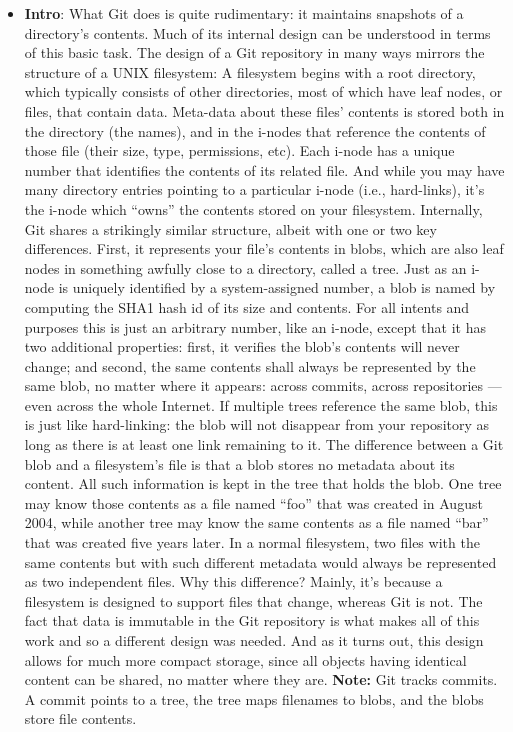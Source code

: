 \documentclass{report}
\begin{document}
\begin{itemize}
        \item \textbf{Intro}: What Git does is quite rudimentary: it maintains snapshots of a directory’s contents. Much of its internal design can be understood in terms of this basic task.
            \bigbreak \noindent 
            The design of a Git repository in many ways mirrors the structure of a UNIX filesystem: A filesystem begins with a root directory, which typically consists of other directories, most of which have leaf nodes, or files, that contain data. Meta-data about these files’ contents is stored both in the directory (the names), and in the i-nodes that reference the contents of those file (their size, type, permissions, etc). Each i-node has a unique number that identifies the contents of its related file. And while you may have many directory entries pointing to a particular i-node (i.e., hard-links), it’s the i-node which “owns” the contents stored on your filesystem.
            \bigbreak \noindent 
            Internally, Git shares a strikingly similar structure, albeit with one or two key differences. First, it represents your file’s contents in blobs, which are also leaf nodes in something awfully close to a directory, called a tree. Just as an i-node is uniquely identified by a system-assigned number, a blob is named by computing the SHA1 hash id of its size and contents. For all intents and purposes this is just an arbitrary number, like an i-node, except that it has two additional properties: first, it verifies the blob’s contents will never change; and second, the same contents shall always be represented by the same blob, no matter where it appears: across commits, across repositories — even across the whole Internet. If multiple trees reference the same blob, this is just like hard-linking: the blob will not disappear from your repository as long as there is at least one link remaining to it.
            \bigbreak \noindent 
            The difference between a Git blob and a filesystem’s file is that a blob stores no metadata about its content. All such information is kept in the tree that holds the blob. One tree may know those contents as a file named “foo” that was created in August 2004, while another tree may know the same contents as a file named “bar” that was created five years later. In a normal filesystem, two files with the same contents but with such different metadata would always be represented as two independent files. Why this difference? Mainly, it’s because a filesystem is designed to support files that change, whereas Git is not. The fact that data is immutable in the Git repository is what makes all of this work and so a different design was needed. And as it turns out, this design allows for much more compact storage, since all objects having identical content can be shared, no matter where they are.
            \bigbreak \noindent 
            \textbf{Note:} Git tracks commits. A commit points to a tree, the tree maps filenames to blobs, and the blobs store file contents.


\end{itemize}
\end{document}
